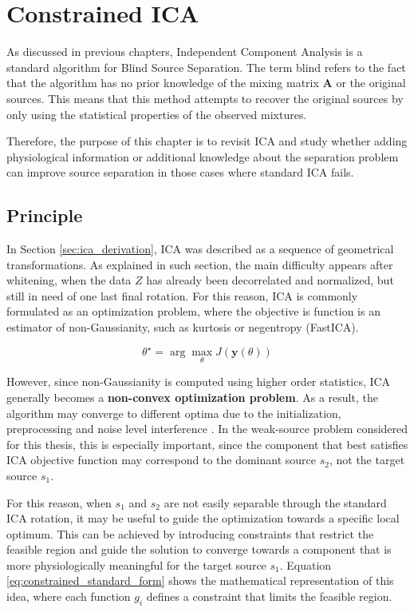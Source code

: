 \chapter{Constrained ICA}
\label{ch:constrained_ica}

As discussed in previous chapters, Independent Component Analysis is a standard algorithm for Blind Source Separation. The term blind refers to the fact that the algorithm has no prior knowledge of the mixing matrix $\mathbf{A}$ or the original sources. This means that this method attempts to recover the original sources by only using the statistical properties of the observed mixtures. 

Therefore, the purpose of this chapter is to revisit ICA and study whether adding physiological information or additional knowledge about the separation problem can improve source separation in those cases where standard ICA fails.

\section{Principle}

In Section \ref{sec:ica_derivation}, ICA was described as a sequence of geometrical transformations. As explained in such section, the main difficulty appears after whitening, when the data $Z$ has already been decorrelated and normalized, but still in need of one last final rotation. For this reason, ICA is commonly formulated as an optimization problem, where the objective is function is an estimator of non-Gaussianity, such as kurtosis or negentropy (FastICA). 

\begin{equation}
\theta^\star = \arg\max_{\theta} J\left(\mathbf{y}(\theta)\right)
\end{equation}

However, since non-Gaussianity is computed using higher order statistics, ICA generally becomes a \textbf{non-convex optimization problem}. As a result, the algorithm may converge to different optima due to the initialization, preprocessing and noise level interference \cite{trehan_non-convex_2020,danilova_recent_2022}. In the weak-source problem considered for this thesis, this is especially important, since the component that best satisfies ICA objective function may correspond to the dominant source $s_2$, not the target source $s_1$. 

For this reason, when $s_1$ and $s_2$ are not easily separable through the standard ICA rotation, it may be useful to guide the optimization towards a specific local optimum. This can be achieved by introducing constraints that restrict the feasible region and guide the solution to converge towards a component that is more physiologically meaningful for the target source $s_1$. Equation \ref{eq:constrained_standard_form} shows the mathematical representation of this idea, where each function $g_i$ defines a constraint that limits the feasible region.

